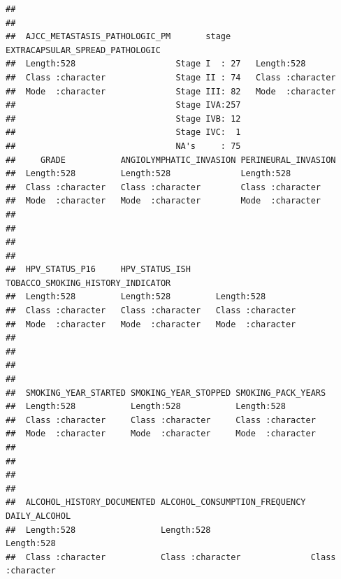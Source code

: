 \documentclass[
  11pt,
]{article}
\begin{document}
\begin{verbatim}
##                                                   
##                                                   
##  AJCC_METASTASIS_PATHOLOGIC_PM       stage     EXTRACAPSULAR_SPREAD_PATHOLOGIC
##  Length:528                    Stage I  : 27   Length:528                     
##  Class :character              Stage II : 74   Class :character               
##  Mode  :character              Stage III: 82   Mode  :character               
##                                Stage IVA:257                                  
##                                Stage IVB: 12                                  
##                                Stage IVC:  1                                  
##                                NA's     : 75                                  
##     GRADE           ANGIOLYMPHATIC_INVASION PERINEURAL_INVASION
##  Length:528         Length:528              Length:528         
##  Class :character   Class :character        Class :character   
##  Mode  :character   Mode  :character        Mode  :character   
##                                                                
##                                                                
##                                                                
##                                                                
##  HPV_STATUS_P16     HPV_STATUS_ISH     TOBACCO_SMOKING_HISTORY_INDICATOR
##  Length:528         Length:528         Length:528                       
##  Class :character   Class :character   Class :character                 
##  Mode  :character   Mode  :character   Mode  :character                 
##                                                                         
##                                                                         
##                                                                         
##                                                                         
##  SMOKING_YEAR_STARTED SMOKING_YEAR_STOPPED SMOKING_PACK_YEARS
##  Length:528           Length:528           Length:528        
##  Class :character     Class :character     Class :character  
##  Mode  :character     Mode  :character     Mode  :character  
##                                                              
##                                                              
##                                                              
##                                                              
##  ALCOHOL_HISTORY_DOCUMENTED ALCOHOL_CONSUMPTION_FREQUENCY DAILY_ALCOHOL     
##  Length:528                 Length:528                    Length:528        
##  Class :character           Class :character              Class :character  

\end{verbatim}
\end{document}
